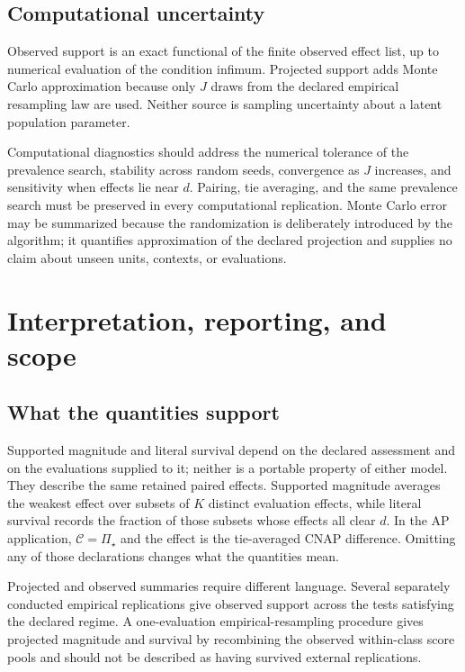 \documentclass[11pt]{article}
\newcommand{\CSet}{\mathcal{C}}
\newcommand{\PSet}{\Pi_\star}
\theoremstyle{remark}
\begin{document}
\subsection{Computational uncertainty}

Observed support is an exact functional of the finite observed effect list, up
to numerical evaluation of the condition infimum. Projected support adds
Monte Carlo approximation because only $J$ draws from the declared empirical
resampling law are used. Neither source is sampling uncertainty about a latent
population parameter.

Computational diagnostics should address the numerical tolerance of the
prevalence search, stability across random seeds, convergence as $J$ increases,
and sensitivity when effects lie near $d$. Pairing, tie averaging, and the same
prevalence search must be preserved in every computational replication. Monte
Carlo error may be summarized because the randomization is deliberately
introduced by the algorithm; it quantifies approximation of the declared
projection and supplies no claim about unseen units, contexts, or evaluations.

\section{Interpretation, reporting, and scope}
\label{sec:discussion}

\subsection{What the quantities support}

Supported magnitude and literal survival depend on the declared assessment and
on the evaluations supplied to it; neither is a portable property of either
model. They describe the same retained paired effects. Supported magnitude
averages the weakest effect over subsets of $K$ distinct evaluation effects,
while literal survival records the fraction of those subsets whose effects all
clear $d$. In the AP application, $\CSet=\PSet$ and the effect is the
tie-averaged CNAP difference. Omitting any of those declarations changes what
the quantities mean.

Projected and observed summaries require different language. Several separately conducted empirical replications give observed support across the tests satisfying the declared regime. A one-evaluation empirical-resampling procedure gives projected magnitude and survival by recombining the observed within-class score pools and should not be described as having survived external replications.
\end{document}
